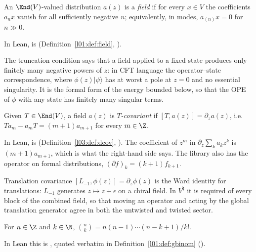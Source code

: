 \begin{definition}[Field]\label{ch10:def:field}
An $\End(V)$-valued distribution $a(z)$ is a \emph{field} if for every $x\in V$ the coefficients
$a_n x$ vanish for all sufficiently negative $n$; equivalently, in modes, $a_{(n)}x=0$ for $n\gg0$.
\end{definition}

In Lean,  is 
(Definition~\ref{l01:def:field}, ).

\begin{physics}
The truncation condition says that a field applied to a fixed state produces only finitely many negative powers of $z$: in CFT language the operator--state correspondence, where $\phi(z)|\psi\rangle$ has at worst a pole at $z=0$ and no essential singularity. It is the formal form of the energy bounded below, so that the OPE of $\phi$ with any state has finitely many singular terms.
\end{physics}

\begin{definition}\label{ch10:def:dcov}
Given $T\in\End(V)$, a field $a(z)$ is \emph{$T$-covariant} if $[T,a(z)]=\partial_z a(z)$,
i.e.\ $Ta_m-a_mT=(m+1)a_{m+1}$ for every $m\in\Z$.
\end{definition}

In Lean,  is 
(Definition~\ref{l03:def:dcov}, ).  The coefficient of $z^m$ in
$\partial_z\sum_k a_kz^k$ is $(m+1)a_{m+1}$, which is what the right-hand side says.  The library
also has the operator  on formal distributions, $(\partial f)_k=(k+1)f_{k+1}$.

\begin{physics}
Translation covariance $[L_{-1},\phi(z)]=\partial_z\phi(z)$ is the Ward identity for translations: $L_{-1}$ generates $z\mapsto z+\epsilon$ on a chiral field. In $V^\natural$ it is required of every block of the combined field, so that moving an operator and acting by the global translation generator agree in both the untwisted and twisted sector.
\end{physics}

\begin{definition}
For $n\in\Z$ and $k\in\N$, $\binom nk=n(n-1)\cdots(n-k+1)/k!$.
\end{definition}
In Lean this is , quoted verbatim in Definition~\ref{l01:def:gbinom}
().

